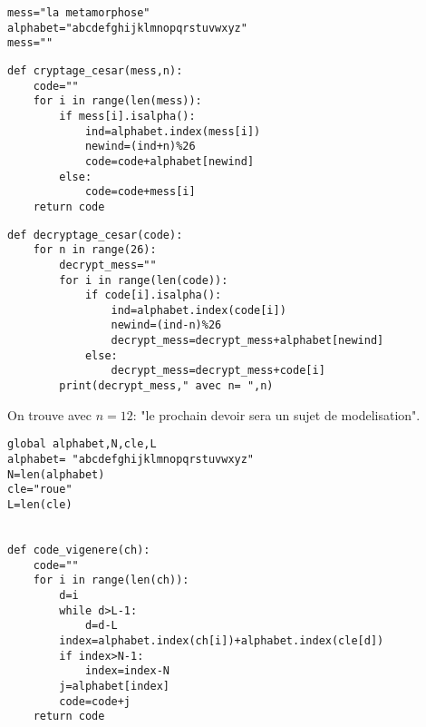 


\question{}

\begin{center}
\begin{lstlisting}
mess="la metamorphose"
alphabet="abcdefghijklmnopqrstuvwxyz"
mess=""
\end{lstlisting}
\end{center}





\question{}


\begin{center}
\begin{lstlisting}
def cryptage_cesar(mess,n):
    code=""
    for i in range(len(mess)):
        if mess[i].isalpha():
            ind=alphabet.index(mess[i])
            newind=(ind+n)%26
            code=code+alphabet[newind]
        else:
            code=code+mess[i]
    return code
\end{lstlisting}
\end{center}

\question{}

\begin{center}
\begin{lstlisting}
def decryptage_cesar(code):
    for n in range(26):
        decrypt_mess=""
        for i in range(len(code)):
            if code[i].isalpha():
                ind=alphabet.index(code[i])
                newind=(ind-n)%26
                decrypt_mess=decrypt_mess+alphabet[newind]
            else:
                decrypt_mess=decrypt_mess+code[i]
        print(decrypt_mess," avec n= ",n)
\end{lstlisting}
\end{center}


\question{}


On trouve avec $n=12$:  "le prochain devoir sera un sujet de modelisation".

\question{}

\begin{center}
\begin{lstlisting}
global alphabet,N,cle,L
alphabet= "abcdefghijklmnopqrstuvwxyz"
N=len(alphabet)
cle="roue"
L=len(cle)


def code_vigenere(ch):
    code=""
    for i in range(len(ch)):
        d=i
        while d>L-1:
            d=d-L
        index=alphabet.index(ch[i])+alphabet.index(cle[d])
        if index>N-1:
            index=index-N
        j=alphabet[index]
        code=code+j
    return code
\end{lstlisting}
\end{center}

